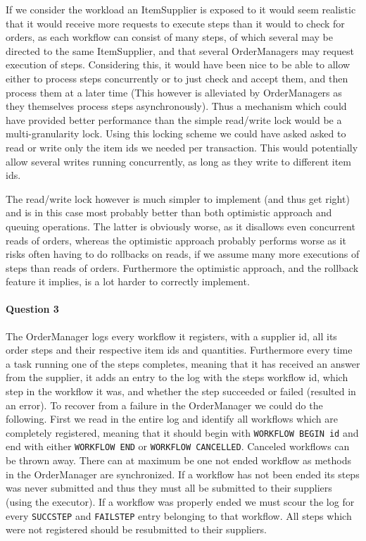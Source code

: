 \documentclass[a4paper, 11pt]{article}
\begin{document}
If we consider the workload an ItemSupplier is exposed to it would seem realistic that it would receive more requests to execute steps than it would to check for orders, as each workflow can consist of many steps, of which several may be directed to the same ItemSupplier, and that several OrderManagers may request execution of steps. Considering this, it would have been nice to be able to allow either to process steps concurrently or to just check and accept them, and then process them at a later time (This however is alleviated by OrderManagers as they themselves process steps asynchronously). Thus a mechanism which could have provided better performance than the simple read/write lock would be a multi-granularity lock. Using this locking scheme we could have asked asked to read or write only the item ids we needed per transaction. This would potentially allow several writes running concurrently, as long as they write to different item ids.

The read/write lock however is much simpler to implement (and thus get right) and is in this case most probably better than both optimistic approach and queuing operations. The latter is obviously worse, as it disallows even concurrent reads of orders, whereas the optimistic approach probably performs worse as it risks often having to do rollbacks on reads, if we assume many more executions of steps than reads of orders. Furthermore the optimistic approach, and the rollback feature it implies, is a lot harder to correctly implement.


\paragraph{Question 3} %
\label{par:question_3}
The OrderManager logs every workflow it registers, with a supplier id, all its order steps and their respective item ids and quantities. Furthermore every time a task running one of the steps completes, meaning that it has received an answer from the supplier, it adds an entry to the log with the steps workflow id, which step in the workflow it was, and whether the step succeeded or failed (resulted in an error). To recover from a failure in the OrderManager we could do the following. First we read in the entire log and identify all workflows which are completely registered, meaning that it should begin with \texttt{WORKFLOW BEGIN id} and end with either \texttt{WORKFLOW END} or \texttt{WORKFLOW CANCELLED}. Canceled workflows can be thrown away. There can at maximum be one not ended workflow as methods in the OrderManager are synchronized. If a workflow has not been ended its steps was never submitted and thus they must all be submitted to their suppliers (using the executor). If a workflow was properly ended we must scour the log for every \texttt{SUCCSTEP} and \texttt{FAILSTEP} entry belonging to that workflow. All steps which were not registered should be resubmitted to their suppliers.
\end{document}
